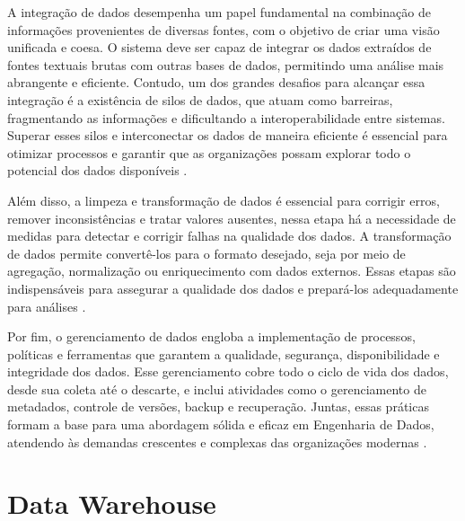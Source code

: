 A integração de dados desempenha um papel fundamental na combinação de informações provenientes de diversas fontes, 
com o objetivo de criar uma visão unificada e coesa. O sistema deve ser capaz de integrar os dados extraídos de 
fontes textuais brutas com outras bases de dados, permitindo uma análise mais abrangente e eficiente. Contudo, 
um dos grandes desafios para alcançar essa integração é a existência de silos de dados, que atuam como barreiras, 
fragmentando as informações e dificultando a interoperabilidade entre sistemas. Superar esses silos e interconectar 
os dados de maneira eficiente é essencial para otimizar processos e garantir que as organizações possam explorar 
todo o potencial dos dados disponíveis \cite{doan2008information}.

Além disso, a limpeza e transformação de dados é essencial para corrigir erros, remover inconsistências e tratar 
valores ausentes, nessa etapa há a necessidade de medidas para detectar e corrigir falhas na qualidade dos dados. 
A transformação de dados permite convertê-los para o formato desejado, seja por meio de agregação, normalização 
ou enriquecimento com dados externos. Essas etapas são indispensáveis para assegurar a qualidade dos dados e 
prepará-los adequadamente para análises \cite{impact_poor_data_1998}.

Por fim, o gerenciamento de dados engloba a implementação de processos, políticas e ferramentas que garantem a 
qualidade, segurança, disponibilidade e integridade dos dados. Esse gerenciamento cobre todo o ciclo de vida dos 
dados, desde sua coleta até o descarte, e inclui atividades como o gerenciamento de metadados, controle de versões, 
backup e recuperação. Juntas, essas práticas formam a base para uma abordagem sólida e eficaz em Engenharia de Dados, 
atendendo às demandas crescentes e complexas das organizações modernas \cite{jahnke2012problem}.

\section{Data Warehouse}

